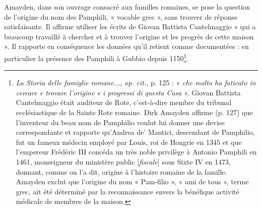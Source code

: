 \documentclass[12pt,twoside,openany]{book}
\begin{document}
Amayden, dans son ouvrage consacré aux familles romaines, se pose la question de l’origine du nom des Pamphili, « vocable grec », sans trouver de réponse satisfaisante. Il affirme utiliser les écrits de Giovan Battista Cantelmaggio « qui a beaucoup travaillé à chercher et à trouver l’origine et les progrès de cette maison ». Il rapporte en conséquence les données qu’il retient comme documentées : en particulier la présence des Pamphili à Gubbio depuis 1150\footnote{\textit{La Storia delle famiglie romane...},\textit{ op. cit.}, p. 125 : « \textit{che molto ha faticato in cercare e trovare l’origine e i progressi di questa Casa} ». Giovan Battista Cantelmaggio était auditeur de Rote, c’est-à-dire membre du tribunal ecclésiastique de la Sainte Rote romaine. Dirk Amayden affirme (p. 127) que l’inventeur du beau nom de Pamphilio voulut lui donner une devise correspondante et rapporte qu’Andrea de’ Mantici, descendant de Pamphilio, fut un fameux médecin employé par Louis, roi de Hongrie en 1345 et que l’empereur Frédéric III concéda un très noble privilège à Antonio Pamphili en 1461, monseigneur du ministère public [\textit{fiscale}] sous Sixte IV en 1473, donnant, comme on l’a dit, origine à l’histoire romaine de la famille. Amayden exclut que l’origine du nom « Pam-filio », « ami de tous », terme grec, ait été déterminé par la reconnaissance envers la bénéfique activité médicale de membres de la maison.}.
\end{document}
